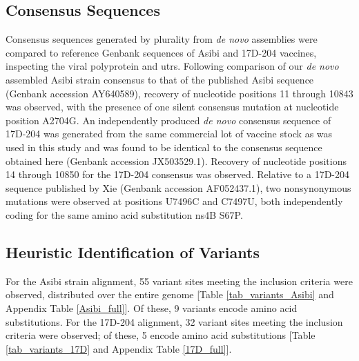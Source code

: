 \subsection{Consensus Sequences}
Consensus sequences generated by plurality from \emph{de novo} assemblies were compared to reference Genbank sequences of Asibi and 17D-204 vaccines, inspecting the viral polyprotein and \glspl{utr}. Following comparison of our \emph{de novo} assembled Asibi strain consensus to that of the published Asibi sequence (Genbank accession AY640589), recovery of nucleotide positions 11 through 10843 was observed, with the presence of one silent consensus mutation at nucleotide position A2704G. An independently produced \emph{de novo} consensus sequence of 17D-204 was generated from the same commercial lot of vaccine stock as was used in this study and was found to be identical to the consensus sequence obtained here (Genbank accession JX503529.1). Recovery of nucleotide positions 14 through 10850 for the 17D-204 consensus was observed. Relative to a 17D-204 sequence published by Xie \parencite{Xie:1998wi} (Genbank accession AF052437.1), two nonsynonymous mutations were observed at positions U7496C and C7497U, both independently coding for the same amino acid substitution \gls{ns}4B S67P. 
\subsection{Heuristic Identification of Variants} 
For the Asibi strain alignment, 55 variant sites meeting the inclusion criteria were observed, distributed over the entire genome [Table \ref{tab_variants_Asibi} and Appendix Table \ref{Asibi_full}]. Of these, 9 variants encode amino acid substitutions. For the 17D-204 alignment, 32 variant sites meeting the inclusion criteria were observed; of these, 5 encode amino acid substitutions [Table \ref{tab_variants_17D} and Appendix Table \ref{17D_full}]. 
